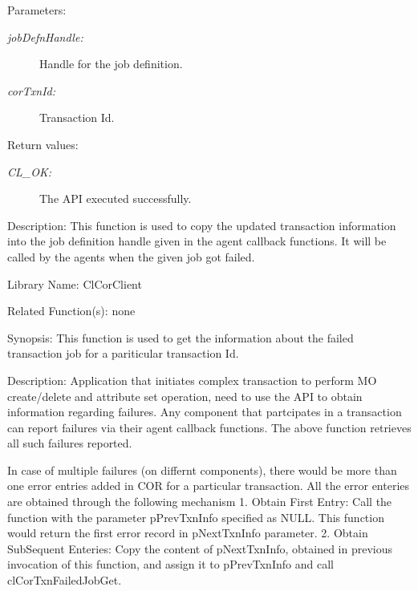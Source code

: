 \begin{Desc}
\item[Parameters:]
\begin{description}
\item[{\em job\-Defn\-Handle:}]Handle for the job definition. \item[{\em cor\-Txn\-Id:}]Transaction Id.\end{description}
\end{Desc}
\begin{Desc}
\item[Return values:]
\begin{description}
\item[{\em CL\_\-OK:}]The API executed successfully.\end{description}
\end{Desc}
\begin{Desc}
\item[Description:]This function is used to copy the updated transaction information into the job definition handle given in the agent callback functions. It will be called by the agents when the given job got failed.\end{Desc}
\begin{Desc}
\item[Library Name:]Cl\-Cor\-Client\end{Desc}
\begin{Desc}
\item[Related Function(s):]none \end{Desc}
\begin{Desc}
\item[Synopsis:]This function is used to get the information about the failed transaction job for a pariticular transaction Id.\end{Desc}
\begin{Desc}
\item[Description:]Application that initiates complex transaction to perform MO create/delete and attribute set operation, need to use the API to obtain information regarding failures. Any component that partcipates in a transaction can report failures via their agent callback functions. The above function retrieves all such failures reported.\end{Desc}
In case of multiple failures (on differnt components), there would be more than one error entries added in COR for a particular transaction. All the error enteries are obtained through the following mechanism 1. Obtain First Entry: Call the function with the parameter p\-Prev\-Txn\-Info specified as NULL. This function would return the first error record in p\-Next\-Txn\-Info parameter. 2. Obtain Sub\-Sequent Enteries: Copy the content of p\-Next\-Txn\-Info, obtained in previous invocation of this function, and assign it to p\-Prev\-Txn\-Info and call cl\-Cor\-Txn\-Failed\-Job\-Get.

